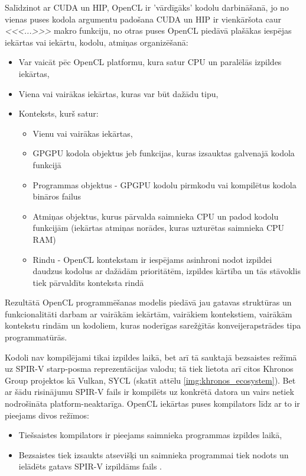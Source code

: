 Salīdzinot ar CUDA un HIP, OpenCL ir 'vārdīgāks' kodolu darbināšanā, jo no
vienas puses kodola argumentu padošana CUDA un HIP ir vienkāršota caur
\textit{<<<...>>>} makro funkciju, no otras puses OpenCL piedāvā plašākas
iespējas iekārtas vai iekārtu, kodolu, atmiņas organizēšanā: \cite{opencl-spec}
\begin{itemize}
    \item Var vaicāt pēc OpenCL platformu, kura satur CPU un paralēlās izpildes
        iekārtas,
    \item Viena vai vairākas iekārtas, kuras var būt dažādu tipu,
    \item Konteksts, kurš satur:
    \begin{itemize}
        \item Vienu vai vairākas iekārtas,
        \item GPGPU kodola objektus jeb funkcijas, kuras izsauktas galvenajā
            kodola funkcijā
        \item Programmas objektus - GPGPU kodolu pirmkodu vai kompilētus kodola
            bināros failus
        \item Atmiņas objektus, kurus pārvalda saimnieka CPU un padod kodolu
            funkcijām (iekārtas atmiņas norādes, kuras uzturētas saimnieka CPU
            RAM)
        \item Rindu - OpenCL kontekstam ir iespējams asinhroni nodot izpildei
            daudzus kodolus ar dažādām prioritātēm, izpildes kārtība un tās stāvoklis
            tiek pārvaldīts konteksta rindā
    \end{itemize}
    
\end{itemize}

Rezultātā OpenCL programmēšanas modelis piedāvā jau gatavas struktūras un
funkcionalitāti darbam ar vairākām iekārtām, vairākiem kontekstiem, vairākām
kontekstu rindām un kodoliem, kuras noderīgas sarežģītās konveijerapstrādes
tipa programmatūrās.

Kodoli nav kompilējami tikai izpildes laikā, bet arī tā sauktajā bezsaistes
režīmā uz SPIR-V starp-posma reprezentācijas valodu; tā tiek lietota arī citos
Khronos Group projektos kā Vulkan, SYCL\cite{spirv-spec} (skatīt attēlu
\ref{img:khronos_ecosystem}). Bet ar šādu risinājumu SPIR-V fails ir kompilēts
uz konkrētā datora un vairs netiek nodrošināta platform-neaktarīga.
OpenCL iekārtas puses kompilators līdz ar to ir pieejams divos režīmos:
\begin{itemize}
    \item Tiešsaistes kompilators ir pieejams saimnieka programmas izpildes
        laikā,
    \item Bezsaistes tiek izsaukts atsevišķi un saimnieka programmai tiek
        nodots un ielādēts gatavs SPIR-V izpildāms fails .
\end{itemize}

